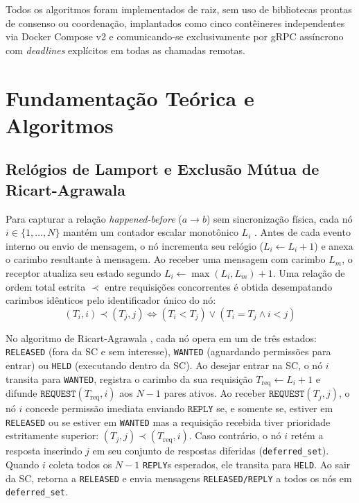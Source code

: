 \documentclass[conference,10pt]{IEEEtran}
\begin{document}
Todos os algoritmos foram implementados de raiz, sem uso de bibliotecas prontas de consenso ou coordenação, implantados como cinco contêineres independentes via Docker Compose v2 e comunicando-se exclusivamente por gRPC assíncrono com \textit{deadlines} explícitos em todas as chamadas remotas.

\section{Fundamentação Teórica e Algoritmos}

\subsection{Relógios de Lamport e Exclusão Mútua de Ricart-Agrawala}

Para capturar a relação \textit{happened-before} ($a \rightarrow b$) sem sincronização física, cada nó $i \in \{1, \dots, N\}$ mantém um contador escalar monotônico $L_i$ \cite{lamport1978}. Antes de cada evento interno ou envio de mensagem, o nó incrementa seu relógio ($L_i \leftarrow L_i + 1$) e anexa o carimbo resultante à mensagem. Ao receber uma mensagem com carimbo $L_m$, o receptor atualiza seu estado segundo $L_i \leftarrow \max(L_i, L_m) + 1$. Uma relação de ordem total estrita $\prec$ entre requisições concorrentes é obtida desempatando carimbos idênticos pelo identificador único do nó:
\begin{equation}
(T_i, i) \prec (T_j, j) \iff (T_i < T_j) \lor (T_i = T_j \land i < j)
\label{eq:lamport_order}
\end{equation}

No algoritmo de Ricart-Agrawala \cite{ricart1981}, cada nó opera em um de três estados: \texttt{RELEASED} (fora da SC e sem interesse), \texttt{WANTED} (aguardando permissões para entrar) ou \texttt{HELD} (executando dentro da SC). Ao desejar entrar na SC, o nó $i$ transita para \texttt{WANTED}, registra o carimbo da sua requisição $T_{\text{req}} \leftarrow L_i + 1$ e difunde $\texttt{REQUEST}(T_{\text{req}}, i)$ aos $N-1$ pares ativos. Ao receber $\texttt{REQUEST}(T_j, j)$, o nó $i$ concede permissão imediata enviando $\texttt{REPLY}$ se, e somente se, estiver em \texttt{RELEASED} ou se estiver em \texttt{WANTED} mas a requisição recebida tiver prioridade estritamente superior: $(T_j, j) \prec (T_{\text{req}}, i)$. Caso contrário, o nó $i$ retém a resposta inserindo $j$ em seu conjunto de respostas diferidas (\texttt{deferred\_set}). Quando $i$ coleta todos os $N-1$ \texttt{REPLY}s esperados, ele transita para \texttt{HELD}. Ao sair da SC, retorna a \texttt{RELEASED} e envia mensagens \texttt{RELEASED/REPLY} a todos os nós em \texttt{deferred\_set}.
\end{document}
